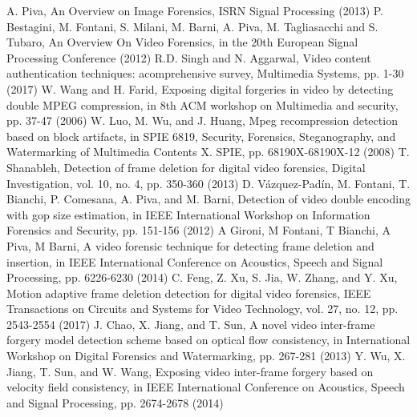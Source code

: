 \documentclass[pdftex,twocolumn,epjc3]{svjour3}          %
\begin{document}
\begin{thebibliography}{}
%
%
A. Piva, An Overview on Image Forensics, ISRN Signal Processing (2013)
P. Bestagini, M. Fontani, S. Milani, M. Barni, A. Piva, M. Tagliasacchi and S. Tubaro, An Overview On Video Forensics, in the 20th European Signal Processing Conference (2012)
R.D. Singh and N. Aggarwal, Video content authentication techniques: acomprehensive survey, Multimedia Systems, pp. 1-30 (2017)
W. Wang and H. Farid, Exposing digital forgeries in video by detecting double MPEG compression, in 8th ACM workshop on Multimedia and security, pp. 37-47 (2006)
W. Luo, M. Wu, and J. Huang, Mpeg recompression detection based on block artifacts, in SPIE 6819, Security, Forensics, Steganography, and Watermarking of Multimedia Contents X. SPIE, pp. 68190X-68190X-12 (2008)
T. Shanableh, Detection of frame deletion for digital video forensics, Digital Investigation, vol. 10, no. 4, pp. 350-360 (2013)
D. V{\'a}zquez-Pad{\'i}n, M. Fontani, T. Bianchi, P. Comesana, A. Piva, and M. Barni, Detection of video double encoding with gop size estimation, in IEEE International Workshop on Information Forensics and Security, pp. 151-156 (2012)
A Gironi, M Fontani, T Bianchi, A Piva, M Barni, A video forensic technique for detecting frame deletion and insertion, in IEEE International Conference on Acoustics, Speech and Signal Processing, pp. 6226-6230 (2014)
C. Feng, Z. Xu, S. Jia, W. Zhang, and Y. Xu, Motion adaptive frame deletion detection for digital video forensics, IEEE Transactions on Circuits and Systems for Video Technology, vol. 27, no. 12, pp. 2543-2554 (2017)
J. Chao, X. Jiang, and T. Sun, A novel video inter-frame forgery model detection scheme based on optical flow consistency, in International Workshop on Digital Forensics and Watermarking, pp. 267-281 (2013)
Y. Wu, X. Jiang, T. Sun, and W. Wang, Exposing video inter-frame forgery based on velocity field consistency, in IEEE International Conference on Acoustics, Speech and Signal Processing, pp. 2674-2678 (2014)

\end{thebibliography}
\end{document}
